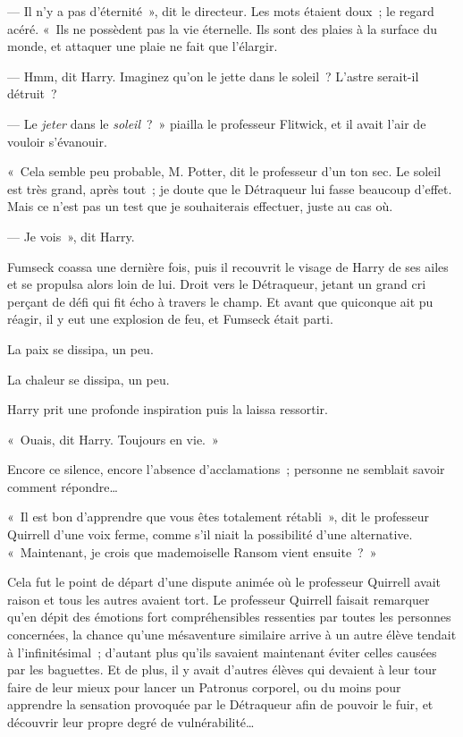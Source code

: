 --- Il n'y a pas d'éternité~», dit le directeur.
Les mots étaient doux~; le regard acéré.
«~Ils ne possèdent pas la vie éternelle.
Ils sont des plaies à la surface du monde, et attaquer une plaie ne fait que l'élargir.

--- Hmm, dit Harry.
Imaginez qu'on le jette dans le soleil~?
L'astre serait-il détruit~?

--- Le \emph{jeter} dans le \emph{soleil}~?~»
piailla le professeur Flitwick, et il avait l'air de vouloir s'évanouir.

«~Cela semble peu probable, M. Potter, dit le professeur d'un ton sec.
Le soleil est très grand, après tout~; je doute que le Détraqueur lui fasse beaucoup d'effet.
Mais ce n'est pas un test que je souhaiterais effectuer, juste au cas où.

--- Je vois~», dit Harry.

Fumseck coassa une dernière fois, puis il recouvrit le visage de Harry de ses ailes et se propulsa alors loin de lui.
Droit vers le Détraqueur, jetant un grand cri perçant de défi qui fit écho à travers le champ.
Et avant que quiconque ait pu réagir, il y eut une explosion de feu, et Fumseck était parti.

La paix se dissipa, un peu.

La chaleur se dissipa, un peu.

Harry prit une profonde inspiration puis la laissa ressortir.

«~Ouais, dit Harry.
Toujours en vie.~»

Encore ce silence, encore l'absence d'acclamations~; personne ne semblait savoir comment répondre…

«~Il est bon d'apprendre que vous êtes totalement rétabli~», dit le professeur Quirrell d'une voix ferme, comme s'il niait la possibilité d'une alternative.
«~Maintenant, je crois que mademoiselle Ransom vient ensuite~?~»

Cela fut le point de départ d'une dispute animée où le professeur Quirrell avait raison et tous les autres avaient tort.
Le professeur Quirrell faisait remarquer qu'en dépit des émotions fort compréhensibles ressenties par toutes les personnes concernées, la chance qu'une mésaventure similaire arrive à un autre élève tendait à l'infinitésimal~; d'autant plus qu'ils savaient maintenant éviter celles causées par les baguettes.
Et de plus, il y avait d'autres élèves qui devaient à leur tour faire de leur mieux pour lancer un Patronus corporel, ou du moins pour apprendre la sensation provoquée par le Détraqueur afin de pouvoir le fuir, et découvrir leur propre degré de vulnérabilité…

